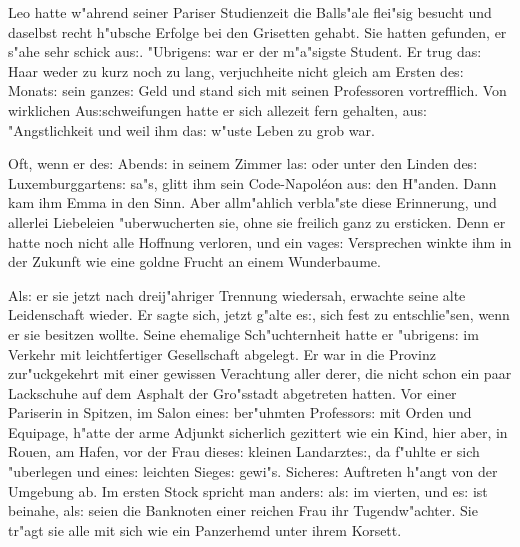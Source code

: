 \documentclass[oneside,12pt]{book}
\newcommand{\s}{s:}%
\begin{document}
\newpage
\thispagestyle{empty}
\begin{center}
\vspace{5cm}
{\Huge \so{Dritte{\s} Bu{ch}}}
\end{center}


\newpage\begin{center}
{\large \so{Er{st}e{\s} Kapitel}}\bigskip\bigskip

\end{center}

Leo hatte w"ahrend seiner Pariser Studienzeit die Balls"ale
flei"sig besucht und daselbst recht h"ubsche Erfolge bei den
Grisetten gehabt. Sie hatten gefunden, er s"ahe sehr schick
au{\s}. "Ubrigen{\s} war er der m"a"sigste Student. Er trug da{\s}
Haar weder zu kurz noch zu lang, verjuchheite nicht gleich am
Ersten de{\s} Monat{\s} sein ganze{\s} Geld und stand sich mit
seinen Professoren vortrefflich. Von wirklichen Au{\s}schweifungen
hatte er sich allezeit fern gehalten, au{\s} "Angstlichkeit und
weil ihm da{\s} w"uste Leben zu grob war.

Oft, wenn er de{\s} Abend{\s} in seinem Zimmer la{\s} oder unter
den Linden de{\s} Luxemburggarten{\s} sa"s, glitt ihm sein
Code-Napol\'eon au{\s} den H"anden. Dann kam ihm Emma in den Sinn.
Aber allm"ahlich verbla"ste diese Erinnerung, und allerlei
Liebeleien "uberwucherten sie, ohne sie freilich ganz zu
ersticken. Denn er hatte noch nicht alle Hoffnung verloren, und
ein vage{\s} Versprechen winkte ihm in der Zukunft wie eine goldne
Frucht an einem Wunderbaume.

Al{\s} er sie jetzt nach dreij"ahriger Trennung wiedersah,
erwachte seine alte Leidenschaft wieder. Er sagte sich, jetzt
g"alte e{\s}, sich fest zu entschlie"sen, wenn er sie besitzen
wollte. Seine ehemalige Sch"uchternheit hatte er "ubrigen{\s} im
Verkehr mit leichtfertiger Gesellschaft abgelegt. Er war in die
Provinz zur"uckgekehrt mit einer gewissen Verachtung aller derer,
die nicht schon ein paar Lackschuhe auf dem Asphalt der Gro"sstadt
abgetreten hatten. Vor einer Pariserin in Spitzen, im Salon
eine{\s} ber"uhmten Professor{\s} mit Orden und Equipage, h"atte
der arme Adjunkt sicherlich gezittert wie ein Kind, hier aber, in
Rouen, am Hafen, vor der Frau diese{\s} kleinen Landarzte{\s}, da
f"uhlte er sich "uberlegen und eine{\s} leichten Siege{\s} gewi"s.
Sichere{\s} Auftreten h"angt von der Umgebung ab. Im ersten Stock
spricht man ander{\s} al{\s} im vierten, und e{\s} ist beinahe,
al{\s} seien die Banknoten einer reichen Frau ihr Tugendw"achter.
Sie tr"agt sie alle mit sich wie ein Panzerhemd unter ihrem
Korsett.
\end{document}
